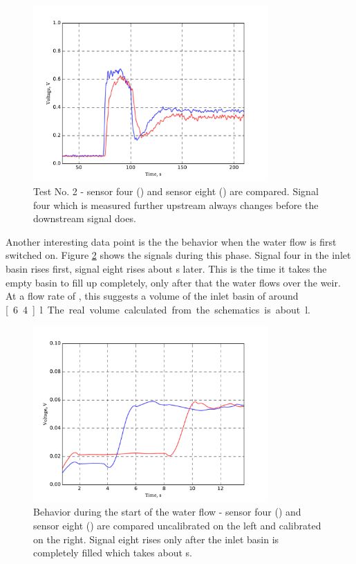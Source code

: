 \begin{figure}[H]
	\begin{center}
		\includegraphics[width=0.8\textwidth]{images/log080716_2.pdf} 
		\caption{Test No. 2 - sensor four (\drawline[blue]) and sensor eight (\drawline[red]) are compared. Signal four which is measured further upstream always changes before the downstream signal does.}
		\label{fig:test2}
	\end{center}
\end{figure}

Another interesting data point is the the behavior when the water flow is first switched on. Figure \ref{fig:test2_on} shows the signals during this phase. Signal four in the inlet basin rises first, signal eight rises about \unit[4]{s} later. This is the time it takes the empty basin to fill up completely, only after that the water flows over the weir. At a flow rate of , this suggests a volume of the inlet basin of around \unit[6.4]{l}. The real volume calculated from the schematics is about \unit[6]{l}.

\begin{figure}[H]
	\begin{center}
		\includegraphics[width=0.8\textwidth]{images/log080716_2_on.pdf} 
		\caption{Behavior during the start of the water flow - sensor four (\drawline[blue]) and sensor eight (\drawline[red]) are compared uncalibrated on the left and calibrated on the right. Signal eight rises only after the inlet basin is completely filled which takes about \unit[4]{s}.}
		\label{fig:test2_on}
	\end{center}
\end{figure}

